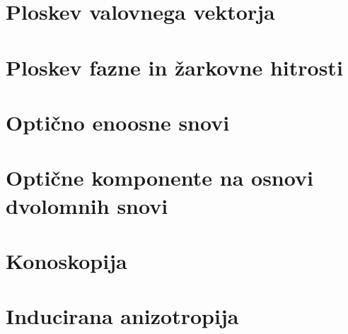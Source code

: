 \section{Ploskev valovnega vektorja}
\section{Ploskev fazne in žarkovne hitrosti}
\section{Optično enoosne snovi}
\section{Optične komponente na osnovi dvolomnih snovi}
\section{Konoskopija}
\section{Inducirana anizotropija}
